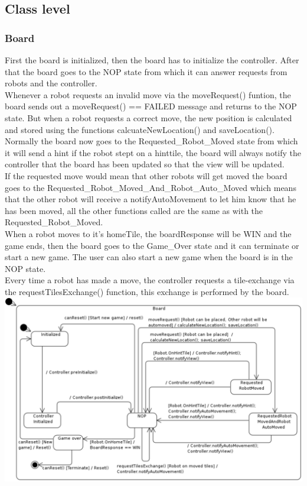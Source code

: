 \subsection{Class level}
	\subsubsection{Board}
	First the board is initialized, then the board has to initialize the controller. After that the board goes to the NOP state from which it can answer requests from robots and the controller. \\
Whenever a robot requests an invalid move via the moveRequest() funtion, the board sends out a moveRequest() == FAILED message and returns to the NOP state. But when a robot requests a correct move, the new position is calculated and stored using the functions calcuateNewLocation() and saveLocation(). \\
Normally the board now goes to the Requested_Robot_Moved state from which it will send a hint if the robot stept on a hinttile, the board will always notify the controller that the board has been updated so that the view will be updated.\\
If the requested move would mean that other robots will get moved the board goes to the Requested_Robot_Moved_And_Robot_Auto_Moved which means that the other robot will receive a notifyAutoMovement to let him know that he has been moved, all the other functions called are the same as with the Requested_Robot_Moved.\\
When a robot moves to it's homeTile, the boardResponse will be WIN and the game ends, then the board goes to the Game_Over state and it can terminate or start a new game. The user can also start a new game when the board is in the NOP state.\\
Every time a robot has made a move, the controller requests a tile-exchange via the requestTilesExchange() function, this exchange is performed by the board.\\
	
	\includegraphics[width=\linewidth]{statecharts/board.pdf}

